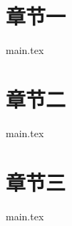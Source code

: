 \documentclass{report}
\begin{document}



\tableofcontents
\newpage


\chapter{章节一}
{main.tex}
\chapter{章节二}
{main.tex}
\chapter{章节三}
{main.tex}
\end{document}
